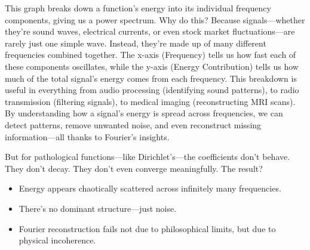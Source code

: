\begin{center}
\end{center}

This graph breaks down a function’s energy into its individual frequency components, giving us a power spectrum. Why do this? Because signals—whether they’re sound waves, electrical currents, or even stock market fluctuations—are rarely just one simple wave. Instead, they’re made up of many different frequencies combined together. The x-axis (Frequency) tells us how fast each of these components oscillates, while the y-axis (Energy Contribution) tells us how much of the total signal's energy comes from each frequency. This breakdown is useful in everything from audio processing (identifying sound patterns), to radio transmission (filtering signals), to medical imaging (reconstructing MRI scans). By understanding how a signal’s energy is spread across frequencies, we can detect patterns, remove unwanted noise, and even reconstruct missing information—all thanks to Fourier’s insights.

But for pathological functions—like Dirichlet’s—the coefficients don’t behave. They don’t decay. They don't even converge meaningfully. The result?

\begin{itemize}
    \item Energy appears chaotically scattered across infinitely many frequencies.
    \item There’s no dominant structure—just noise.
    \item Fourier reconstruction fails not due to philosophical limits, but due to physical incoherence.
\end{itemize}

